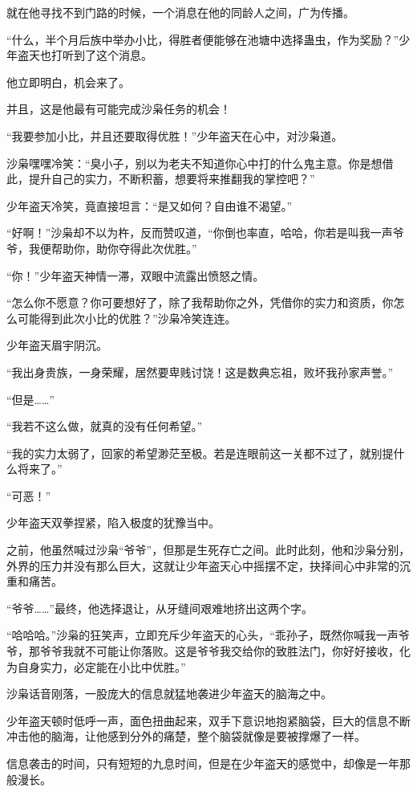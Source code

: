 \begin{this_body}
就在他寻找不到门路的时候，一个消息在他的同龄人之间，广为传播。

“什么，半个月后族中举办小比，得胜者便能够在池塘中选择蛊虫，作为奖励？”少年盗天也打听到了这个消息。

他立即明白，机会来了。

并且，这是他最有可能完成沙枭任务的机会！

“我要参加小比，并且还要取得优胜！”少年盗天在心中，对沙枭道。

沙枭嘿嘿冷笑：“臭小子，别以为老夫不知道你心中打的什么鬼主意。你是想借此，提升自己的实力，不断积蓄，想要将来推翻我的掌控吧？”

少年盗天冷笑，竟直接坦言：“是又如何？自由谁不渴望。”

“好啊！”沙枭却不以为杵，反而赞叹道，“你倒也率直，哈哈，你若是叫我一声爷爷，我便帮助你，助你夺得此次优胜。”

“你！”少年盗天神情一滞，双眼中流露出愤怒之情。

“怎么你不愿意？你可要想好了，除了我帮助你之外，凭借你的实力和资质，你怎么可能得到此次小比的优胜？”沙枭冷笑连连。

少年盗天眉宇阴沉。

“我出身贵族，一身荣耀，居然要卑贱讨饶！这是数典忘祖，败坏我孙家声誉。”

“但是……”

“我若不这么做，就真的没有任何希望。”

“我的实力太弱了，回家的希望渺茫至极。若是连眼前这一关都不过了，就别提什么将来了。”

“可恶！”

少年盗天双拳捏紧，陷入极度的犹豫当中。

之前，他虽然喊过沙枭“爷爷”，但那是生死存亡之间。此时此刻，他和沙枭分别，外界的压力并没有那么巨大，这就让少年盗天心中摇摆不定，抉择间心中非常的沉重和痛苦。

“爷爷……”最终，他选择退让，从牙缝间艰难地挤出这两个字。

“哈哈哈。”沙枭的狂笑声，立即充斥少年盗天的心头，“乖孙子，既然你喊我一声爷爷，那爷爷我就不可能让你落败。这是爷爷我交给你的致胜法门，你好好接收，化为自身实力，必定能在小比中优胜。”

沙枭话音刚落，一股庞大的信息就猛地袭进少年盗天的脑海之中。

少年盗天顿时低呼一声，面色扭曲起来，双手下意识地抱紧脑袋，巨大的信息不断冲击他的脑海，让他感到分外的痛楚，整个脑袋就像是要被撑爆了一样。

信息袭击的时间，只有短短的九息时间，但是在少年盗天的感觉中，却像是一年那般漫长。


\end{this_body}
